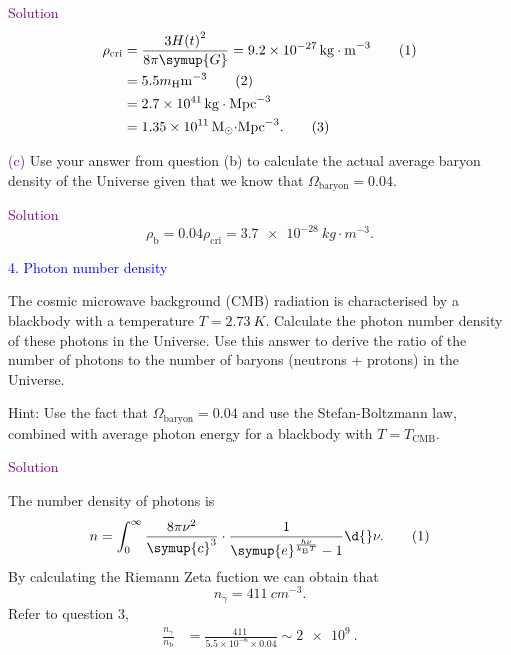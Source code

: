 \documentclass[UTF8, 12pt, a4paper, oneside, twocolumn, fontset=none]{ctexart}
\begin{document}
\noindent\textcolor{purple}{Solution}
\begin{align}
\rho_{\mathrm{cri}}&=\frac{3H\mleft(t\mright)^{2}}{8\pi\symup{G}}=\qty{9.2e-27}{kg\cdot{}m^{-3}}\tag{1}\\
&=5.5m_{\ce{H}}\qty{}{m^{-3}}\tag{2}\\
&=\qty{2.7e41}{kg\cdot{}Mpc^{-3}}\notag\\
&=\qty{1.35e11}{M_{\odot}\cdot{}Mpc^{-3}}.\tag{3}
\end{align}

\hspace*{\fill}

\noindent\textcolor{purple}{(c)} Use your answer from question (b) to calculate the actual average baryon density of the Universe given that we know that $\Omega_{\mathrm{baryon}}=0.04$.

\hspace*{\fill}

\noindent\textcolor{purple}{Solution}
\begin{equation}
\rho_{\mathrm{b}}=0.04\rho_{\mathrm{cri}}=\qty{3.7e-28}{kg\cdot{}m^{-3}}.\tag{1}
\end{equation}

\hspace*{\fill}

\noindent\textcolor{blue}{4. Photon number density}

\noindent The cosmic microwave background (CMB) radiation is characterised by a blackbody with a temperature $T=\qty{2.73}{K}$. Calculate the photon number density of these photons in the Universe. Use this answer to derive the ratio of the number of photons to the number of baryons (neutrons + protons) in the Universe.

\noindent Hint: Use the fact that $\Omega_{\mathrm{baryon}}=0.04$ and use the Stefan-Boltzmann law, combined with average photon energy for a blackbody with $T=T_{\mathrm{CMB}}$.

\hspace*{\fill}

\noindent\textcolor{purple}{Solution}

The number density of photons is
\begin{equation}
n=\int_{0}^{\infty}\frac{8\pi\nu^{2}}{\symup{c}^{3}}\cdot\frac{1}{\symup{e}^{\frac{h\nu}{k_{\mathrm{B}}T}}-1}\d{}\nu.\tag{1}
\end{equation}
By calculating the Riemann Zeta fuction we can obtain that
\begin{equation}
n_{\gamma}=\qty{411}{cm^{-3}}.\tag{2}
\end{equation}
Refer to question 3,
\begin{align}
\frac{n_{\gamma}}{n_{\mathrm{b}}}&=\frac{\qty{411}{}}{5.5\times10^{-6}\times0.04}\sim\qty{2e9}{}.\tag{3}
\end{align}

\end{document}
